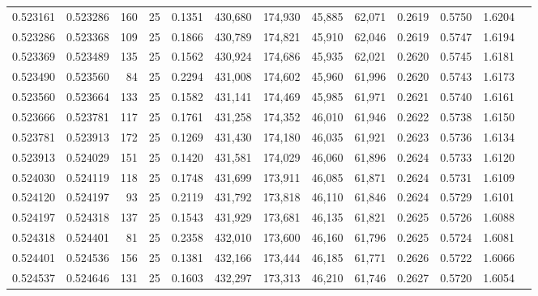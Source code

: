 \begin{tabular}{rrrrrrrrrrrrr}
0.523161 & 0.523286 &   160 &  25 &                                     0.1351 & 430,680 & 174,930 &  45,885 &  62,071 & 0.2619 & 0.5750 & 1.6204 \\
0.523286 & 0.523368 &   109 &  25 &                                     0.1866 & 430,789 & 174,821 &  45,910 &  62,046 & 0.2619 & 0.5747 & 1.6194 \\
0.523369 & 0.523489 &   135 &  25 &                                     0.1562 & 430,924 & 174,686 &  45,935 &  62,021 & 0.2620 & 0.5745 & 1.6181 \\
0.523490 & 0.523560 &    84 &  25 &                                     0.2294 & 431,008 & 174,602 &  45,960 &  61,996 & 0.2620 & 0.5743 & 1.6173 \\
0.523560 & 0.523664 &   133 &  25 &                                     0.1582 & 431,141 & 174,469 &  45,985 &  61,971 & 0.2621 & 0.5740 & 1.6161 \\
0.523666 & 0.523781 &   117 &  25 &                                     0.1761 & 431,258 & 174,352 &  46,010 &  61,946 & 0.2622 & 0.5738 & 1.6150 \\
0.523781 & 0.523913 &   172 &  25 &                                     0.1269 & 431,430 & 174,180 &  46,035 &  61,921 & 0.2623 & 0.5736 & 1.6134 \\
0.523913 & 0.524029 &   151 &  25 &                                     0.1420 & 431,581 & 174,029 &  46,060 &  61,896 & 0.2624 & 0.5733 & 1.6120 \\
0.524030 & 0.524119 &   118 &  25 &                                     0.1748 & 431,699 & 173,911 &  46,085 &  61,871 & 0.2624 & 0.5731 & 1.6109 \\
0.524120 & 0.524197 &    93 &  25 &                                     0.2119 & 431,792 & 173,818 &  46,110 &  61,846 & 0.2624 & 0.5729 & 1.6101 \\
0.524197 & 0.524318 &   137 &  25 &                                     0.1543 & 431,929 & 173,681 &  46,135 &  61,821 & 0.2625 & 0.5726 & 1.6088 \\
0.524318 & 0.524401 &    81 &  25 &                                     0.2358 & 432,010 & 173,600 &  46,160 &  61,796 & 0.2625 & 0.5724 & 1.6081 \\
0.524401 & 0.524536 &   156 &  25 &                                     0.1381 & 432,166 & 173,444 &  46,185 &  61,771 & 0.2626 & 0.5722 & 1.6066 \\
0.524537 & 0.524646 &   131 &  25 &                                     0.1603 & 432,297 & 173,313 &  46,210 &  61,746 & 0.2627 & 0.5720 & 1.6054 \\

\end{tabular}
